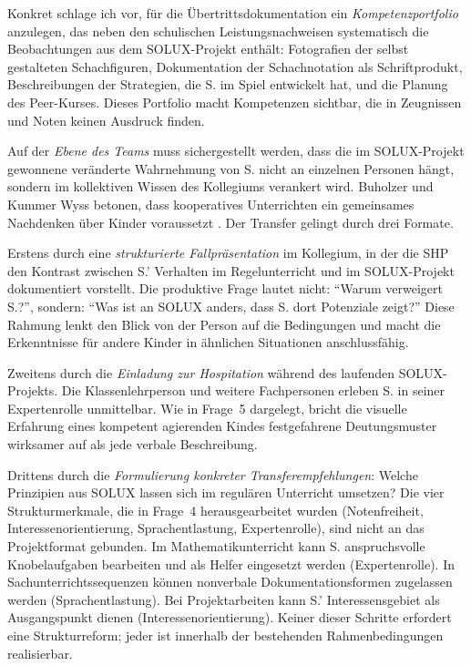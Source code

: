 \documentclass[ngerman, a4paper]{article}
\begin{document}
Konkret schlage ich vor, für die Übertrittsdokumentation ein
\textit{Kompetenzportfolio} anzulegen, das neben den schulischen
Leistungsnachweisen systematisch die Beobachtungen aus dem SOLUX-Projekt
enthält: Fotografien der selbst gestalteten Schachfiguren, Dokumentation
der Schachnotation als Schriftprodukt, Beschreibungen der Strategien, die
S. im Spiel entwickelt hat, und die Planung des Peer-Kurses. Dieses Portfolio
macht Kompetenzen sichtbar, die in Zeugnissen und Noten keinen Ausdruck finden.

Auf der \textit{Ebene des Teams} muss sichergestellt werden, dass die im
SOLUX-Projekt gewonnene veränderte Wahrnehmung von S. nicht an einzelnen
Personen hängt, sondern im kollektiven Wissen des Kollegiums verankert wird.
Buholzer und Kummer Wyss betonen, dass kooperatives Unterrichten ein gemeinsames
Nachdenken über Kinder voraussetzt \parencite{buholzer2010allegleich}. Der
Transfer gelingt durch drei Formate.

Erstens durch eine \textit{strukturierte Fallpräsentation} im Kollegium, in
der die SHP den Kontrast zwischen S.' Verhalten im Regelunterricht und im
SOLUX-Projekt dokumentiert vorstellt. Die produktive Frage lautet nicht:
\enquote{Warum verweigert S.?}, sondern: \enquote{Was ist an SOLUX anders, dass
S. dort Potenziale zeigt?} Diese Rahmung lenkt den Blick von der Person auf
die Bedingungen und macht die Erkenntnisse für andere Kinder in ähnlichen
Situationen anschlussfähig.

Zweitens durch die \textit{Einladung zur Hospitation} während des laufenden
SOLUX-Projekts. Die Klassenlehrperson und weitere Fachpersonen erleben S. in
seiner Expertenrolle unmittelbar. Wie in Frage~5 dargelegt, bricht die
visuelle Erfahrung eines kompetent agierenden Kindes festgefahrene
Deutungsmuster wirksamer auf als jede verbale Beschreibung.

Drittens durch die \textit{Formulierung konkreter Transferempfehlungen}:
Welche Prinzipien aus SOLUX lassen sich im regulären Unterricht umsetzen?
Die vier Strukturmerkmale, die in Frage~4 herausgearbeitet wurden
(Notenfreiheit, Interessenorientierung, Sprachentlastung, Expertenrolle),
sind nicht an das Projektformat gebunden. Im Mathematikunterricht kann S.
anspruchsvolle Knobelaufgaben bearbeiten und als Helfer eingesetzt werden
(Expertenrolle). In Sachunterrichtssequenzen können nonverbale
Dokumentationsformen zugelassen werden (Sprachentlastung). Bei
Projektarbeiten kann S.' Interessensgebiet als Ausgangspunkt dienen
(Interessenorientierung). Keiner dieser Schritte erfordert eine
Strukturreform; jeder ist innerhalb der bestehenden Rahmenbedingungen
realisierbar.
\end{document}
